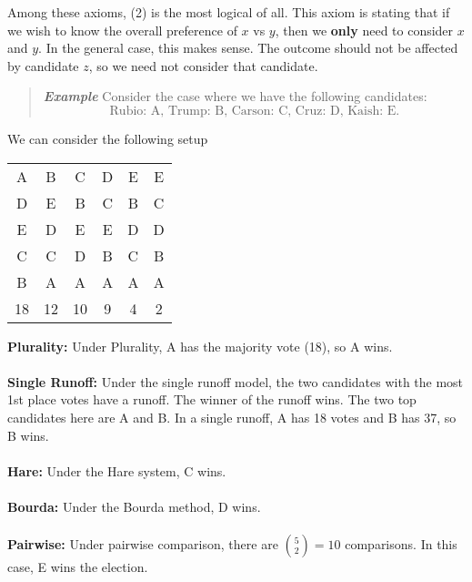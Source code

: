 \documentclass{hw}
\begin{document}
Among these axioms, (2) is the most logical of all. This axiom is stating that if we wish to know the
overall preference of $x$ vs $y$, then we \textbf{only} need to consider $x$ and $y$. In the general
case, this makes sense. The outcome should not be affected by candidate $z$, so we need not consider that
candidate.

\begin{quote}
\textit{\textbf{Example}} Consider the case where we have the following candidates:\\
\[\text{Rubio: A, Trump: B, Carson: C, Cruz: D, Kaish: E.}\]
\end{quote}
We can consider the following setup\\
\begin{center}
\begin{tabular}{c c c c c c}
A & B & C & D & E & E\\
D & E & B & C& B &C\\
E&D&E&E&D&D\\
C&C&D&B&C&B\\
B&A&A&A&A&A\\
\hline
18 & 12 & 10 & 9 & 4 & 2
\end{tabular}
\end{center}
\textbf{Plurality:} Under Plurality, A has the majority vote (18), so A wins.\\\\
\textbf{Single Runoff:} Under the single runoff model, the two candidates with the most 1st place votes
have a runoff. The winner of the runoff wins. The two top candidates here are A and B. In a single
runoff, A has 18 votes and B has 37, so B wins.\\\\
\textbf{Hare:} Under the Hare system, C wins.\\\\
\textbf{Bourda:} Under the Bourda method, D wins.\\\\
\textbf{Pairwise:} Under pairwise comparison, there are ${5 \choose 2} = 10$ comparisons.
In this case, E wins the election.
\end{document}
